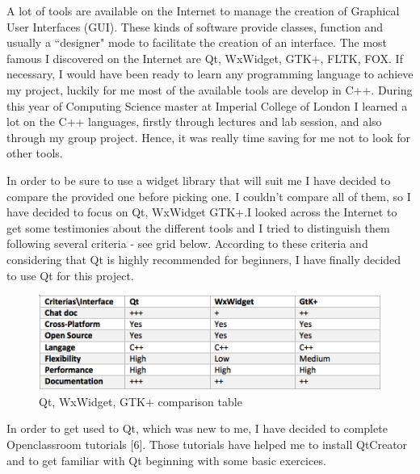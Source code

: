 A lot of tools are available on the Internet to manage the creation of Graphical User Interfaces (GUI). These kinds of software provide classes, function and usually a ``designer" mode to facilitate the creation of an interface. The most famous I discovered on the Internet are Qt, WxWidget, GTK+, FLTK, FOX. If necessary, I would have been ready to learn any programming language to achieve my project, luckily for me most of the available tools are develop in C++. During this year of Computing Science master at Imperial College of London I learned a lot on the C++ languages, firstly through lectures and lab session, and also through my group project. Hence, it was really time saving for me not to look for other tools. 

\newline \vspace{5mm}

In order to be sure to use a widget library that will suit me I have decided to compare the provided one before picking one. I couldn't compare all of them, so I have decided to focus on Qt, WxWidget GTK+.I looked across the Internet to get some testimonies about the different tools and I tried to distinguish them following several criteria - see grid below. According to these criteria and considering that Qt is highly recommended for beginners, I have finally decided to use Qt for this project.

\begin{figure}[ht]
\centering
\includegraphics[width = 0.99\hsize]{./figures/comparison}
\caption{Qt, WxWidget, GTK+ comparison table}
\end{figure}
 

In order to get used to Qt, which was new to me, I have decided to complete Openclassroom tutorials [6]. Those tutorials have helped me to install QtCreator and to get familiar with Qt beginning with some basic exercices.